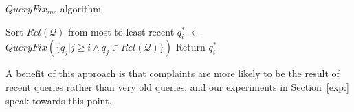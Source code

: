 \begin{algorithm}[htbp]
\caption{$QueryFix_{inc}$ algorithm.}
\label{alg:incalg}
\begin{algorithmic}
\STATE Sort $Rel\mathcal{(Q)}$ from most to least recent
  \STATE $q_i^*$ $\leftarrow$ $QueryFix(\{q_j | j \ge i \wedge q_j \in Rel\mathcal{(Q)}\})$
    \STATE Return $q_i^*$
  \ENDIF
\ENDFOR
\end{algorithmic}
\end{algorithm}



A benefit of this approach is that complaints are more likely to be the result of
recent queries rather than very old queries, and our experiments in Section~\ref{exp:}
speak towards this point.




